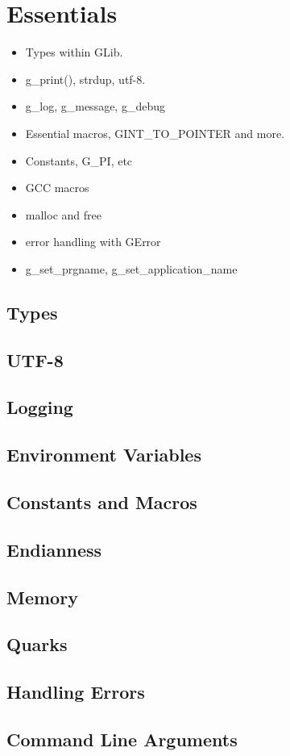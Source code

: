 \chapter{Essentials}

\begin{itemize}
\item Types within GLib.
\item g\_print(), strdup, utf-8.
\item g\_log, g\_message, g\_debug
\item Essential macros, GINT\_TO\_POINTER and more.
\item Constants, G\_PI, etc
\item GCC macros
\item malloc and free
\item error handling with GError
\item g\_set\_prgname, g\_set\_application\_name
\end{itemize}

\section{Types}

\section{UTF-8}

\section{Logging}

\section{Environment Variables}

\section{Constants and Macros}

\section{Endianness}

\section{Memory}

\section{Quarks}

\section{Handling Errors}

\section{Command Line Arguments}
